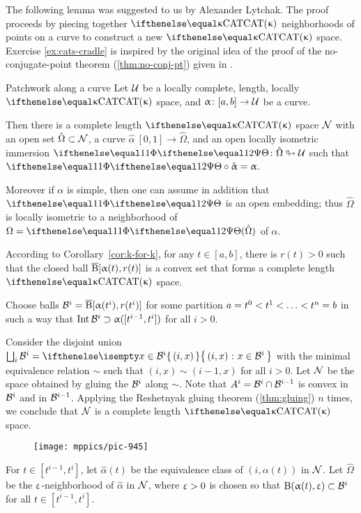 The following lemma was suggested to us by Alexander Lytchak.
The proof proceeds by piecing together $\CAT{\kappa}$  neighborhoods of points on a curve to construct a new $\CAT{\kappa}$ space.  
Exercise \ref{ex:cats-cradle} is inspired by the original idea of the proof of the no-conjugate-point theorem (\ref{thm:no-conj-pt}) given in \cite{alexander-bishop:h-c}.

\begin{thm}{Patchwork along a curve}
\label{lem:patch}
Let $\mathcal{U}$ be a locally complete, length, locally $\CAT\kappa$ space, 
and $\alpha\:[a,b]\to\spc{U}$ be a curve.

Then there is a complete length $\CAT\kappa$ space $\mathcal{N}$
with an open set $\hat\Omega\subset \spc{N}$,
a curve $\hat\alpha\:[0,1]\to\hat\Omega$,
and an open locally isometric immersion 
 $\map\:\hat\Omega\looparrowright\spc{U}$ such that
$\map\circ\hat\alpha=\alpha$.

Moreover if $\alpha$ is simple, then one can assume in addition that $\map$ is an open embedding;
thus $\hat\Omega$ is locally isometric to a neighborhood of $\Omega=\map(\hat\Omega)$ of $\alpha$.
\end{thm}



According to Corollary~\ref{cor:k-for-k},
for any $t\in[a,b]$, there is $r(t)>0$ 
such that the closed ball
$\overline{\mathrm{B}}{}[\upalpha(t),r(t)]$ is a  convex set  that forms a complete length $\CAT\kappa$ space.

Choose balls $\mathcal{B}^i=\overline{\mathrm{B}}{}[\upalpha(t^i),r(t^i)]$
for some partition $a\z=t^0<t^1\z<\z\dots\z<t^n\z=b$
in such a way that 
$\Int\spc{B}^i\supset \alpha([t^{i-1},t^i])$ for all $i>0$.

Consider the disjoint union $\bigsqcup_i\spc{B}^i=\set{(i,x)}{x\in\spc{B}^i}$ with the minimal equivalence relation $\sim$ such that $(i,x)\sim(i-1,x)$ for all $i>0$.
Let  $\mathcal{N}$ be the space obtained by gluing the $\mathcal{B}^i$ along $\sim$.
Note that $A^i=\spc{B}^i\cap\spc{B}^{i-1}$ is convex in $\mathcal{B}^i$ and in $\mathcal{B}^{i-1}$.
Applying the Reshetnyak gluing theorem (\ref{thm:gluing}) $n$ times, 
we conclude that $\mathcal{N}$ is a complete length $\CAT\kappa$ space.

\begin{figure}[!ht]
\vskip-0mm
\centering
\texttt{[image: mppics/pic-945]}
\end{figure}

For $t\in[t^{i-1},t^i]$, let $\hat\alpha(t)$  be the equivalence class of $(i,\alpha(t))$ in $\mathcal{N}$.
Let $\hat\Omega$ be the $\upvarepsilon$-neighborhood of $\hat\alpha$ in $\mathcal{N}$, where $\upvarepsilon>0$ is chosen so that $\oBall(\alpha(t),\eps)\subset\spc{B}^i$ for all $t\in[t^{i-1},t^i]$.

